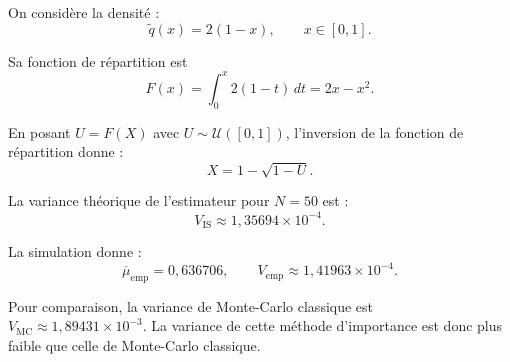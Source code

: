 \documentclass[12pt,a4paper]{article}
\begin{document}
On considère la densité :
\[
\widetilde q(x)=2(1-x),\qquad x\in[0,1].
\]

Sa fonction de répartition est
\[
F(x)=\int_0^x 2(1-t)\,dt=2x-x^2.
\]

En posant $U=F(X)$ avec $U\sim\mathcal U([0,1])$,
l'inversion de la fonction de répartition donne :
\[
\boxed{X=1-\sqrt{1-U}.}
\]

La variance théorique de l'estimateur pour $N=50$ est :
\[
V_{\mathrm{IS}}\approx 1{,}35694\times10^{-4}.
\]

La simulation donne :
\[
\overline{\mu}_{\mathrm{emp}}=0{,}636706,
\qquad
V_{\mathrm{emp}}\approx 1{,}41963\times10^{-4}.
\]

Pour comparaison, la variance de Monte-Carlo classique
est $V_{\mathrm{MC}}\approx 1{,}89431\times10^{-3}$.
La variance de cette méthode d'importance est donc plus
faible que celle de Monte-Carlo classique.
\end{document}
